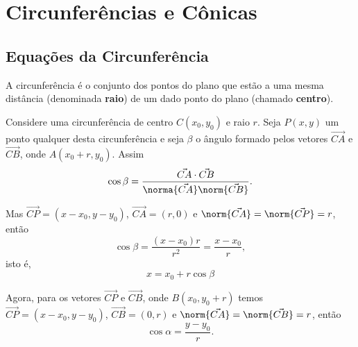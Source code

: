 
\chapter{Circunfer\^encias e C\^onicas} %
\label{cha:circunferencias_e_conicas}

\section{Equa\c{c}\~oes da Circunfer\^encia} %
\label{sec:equacoes_da_circunferencias}

\begin{definicao}
  A circunfer\^encia \'e o conjunto dos pontos do plano que est\~ao a uma mesma dist\^ancia (denominada \textbf{raio}) de um dado ponto do plano (chamado \textbf{centro}).
\end{definicao}

Considere uma circunfer\^encia de centro $C(x_0,y_0)$ e raio $r$. Seja $P(x,y)$ um ponto qualquer desta circunfer\^encia e seja $\beta$ o \^angulo formado pelos vetores $\vec{CA}$ e $\vec{CB}$, onde $A(x_0 + r, y_0)$. Assim
\[
  \cos\beta = \dfrac{\vec{CA}\cdot\vec{CB}}{\norma{\vec{CA}}\norm{\vec{CB}}}.
\]

Mas $\vec{CP} = (x - x_0, y - y_0)$, $\vec{CA} = (r, 0)$ e $\norm{\vec{CA}} = \norm{\vec{CP}} = r$, ent\~ao
\[
  \cos\beta = \dfrac{(x - x_0)r}{r^2} = \dfrac{x - x_0}{r},
\]
isto \'e,
\begin{equation}\label{equacaoparametricaX}
  x = x_0 + r\cos\beta
\end{equation}

Agora, para os vetores $\vec{CP}$ e $\vec{CB}$, onde $B(x_0, y_0 + r)$ temos $\vec{CP} = (x - x_0, y - y_0)$, $\vec{CB} = (0, r)$ e $\norm{\vec{CA}} = \norm{\vec{CB}} = r$, ent\~ao
\begin{equation}\label{equacaoinicialY}
  \cos\alpha = \dfrac{y - y_0}{r}.
\end{equation}

